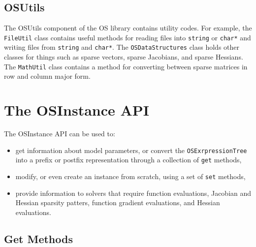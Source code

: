 \documentclass[11pt]{article}
\renewcommand{\_}{{\char"5F}}
\renewcommand{\{}{{\char"7B}}
\renewcommand{\}}{{\char"7D}}
\renewcommand{\^}{{\char"0D}}
\renewcommand{\'}{{\char"0D}}
\begin{document}
\subsection{OSUtils}

The OSUtils component of the OS library contains utility codes. For example, the {\tt FileUtil} class contains useful methods for reading files into {\tt string} or {\tt char*} and writing files from {\tt string} and {\tt char*}.  The {\tt OSDataStructures} class holds other classes for things such as sparse vectors, sparse Jacobians, and sparse Hessians. The {\tt MathUtil} class contains a method for converting between sparse matrices in row and column major form.


\section{The  OSInstance API}\label{section:osinstanceAPI}

The OSInstance API can be used to:

\begin{itemize}

\item  get information about model parameters, or convert the {\tt OSExrpressionTree} into a prefix or postfix representation through a collection  of {\tt get} methods,

\item modify, or even create an instance from scratch, using a set of {\tt set} methods,

\item provide information to solvers that require function evaluations, Jacobian and Hessian sparsity patters,  function gradient evaluations, and Hessian evaluations.

\end{itemize}



\subsection{Get Methods}
\end{document}
